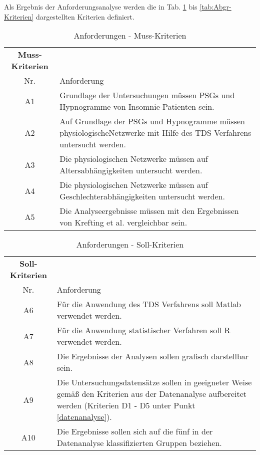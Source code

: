 Als Ergebnis der Anforderungsanalyse werden die in Tab. \ref{tab:Muss-Kriterien} bis \ref{tab:Abgr-Kriterien} dargestellten Kriterien definiert.\\

\begin{table}[H] 
\begin{tabularx}{\textwidth}{cllX}
\toprule
\multicolumn{3}{c}{\textbf{Muss-Kriterien}} & \\  
\cmidrule{1-3}
\multicolumn{3}{c}{Nr.} & Anforderung\\ 
\midrule 
\multicolumn{3}{c}{A1} &  Grundlage der Untersuchungen müssen \acs{PSG}s und Hypnogramme von Insomnie-Patienten sein.\\
\multicolumn{3}{c}{A2} & Auf Grundlage der \acs{PSG}s und Hypnogramme müssen physiologische\newline Netzwerke mit Hilfe des \acs{TDS} Verfahrens untersucht werden.\\
\multicolumn{3}{c}{A3} & Die physiologischen Netzwerke müssen auf Altersabhängigkeiten untersucht werden.\\ 
\multicolumn{3}{c}{A4} & Die physiologischen Netzwerke müssen auf Geschlechterabhängigkeiten untersucht werden.\\
\multicolumn{3}{c}{A5} & Die Analyseergebnisse müssen mit den Ergebnissen von Krefting et al. \parencite{krefting_age_2017} vergleichbar sein.\\
\bottomrule
\end{tabularx}
\caption{Anforderungen - Muss-Kriterien}
\label{tab:Muss-Kriterien}
\end{table}


\begin{table}[H] 
\begin{tabularx}{\textwidth}{cllX}
\toprule
\multicolumn{3}{c}{\textbf{Soll-Kriterien}} & \\  
\cmidrule{1-3}
\multicolumn{3}{c}{Nr.} & Anforderung\\ 
\midrule 
\multicolumn{3}{c}{A6} &  Für die Anwendung des \acs{TDS} Verfahrens soll Matlab verwendet werden.\\
\multicolumn{3}{c}{A7} & Für die Anwendung statistischer Verfahren soll R verwendet werden.\\
\multicolumn{3}{c}{A8} & Die Ergebnisse der Analysen sollen grafisch darstellbar sein.\\ 
\multicolumn{3}{c}{A9} & Die Untersuchungsdatensätze sollen in geeigneter Weise gemäß den Kriterien aus der Datenanalyse aufbereitet werden (Kriterien D1 - D5 unter Punkt \ref{datenanalyse}).\\
\multicolumn{3}{c}{A10} & Die Ergebnisse sollen sich auf die fünf in der Datenanalyse klassifizierten Gruppen beziehen.\\
\bottomrule
\end{tabularx}
\caption{Anforderungen - Soll-Kriterien}
\label{tab:Soll-Kriterien}
\end{table}


